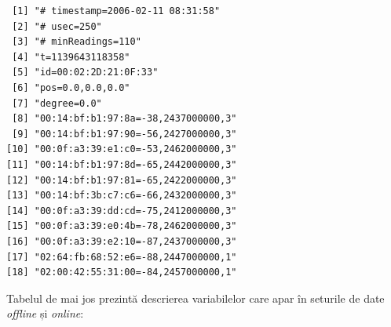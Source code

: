 \documentclass[]{article}
\begin{document}
\begin{verbatim}
 [1] "# timestamp=2006-02-11 08:31:58"   
 [2] "# usec=250"                        
 [3] "# minReadings=110"                 
 [4] "t=1139643118358"                   
 [5] "id=00:02:2D:21:0F:33"              
 [6] "pos=0.0,0.0,0.0"                   
 [7] "degree=0.0"                        
 [8] "00:14:bf:b1:97:8a=-38,2437000000,3"
 [9] "00:14:bf:b1:97:90=-56,2427000000,3"
[10] "00:0f:a3:39:e1:c0=-53,2462000000,3"
[11] "00:14:bf:b1:97:8d=-65,2442000000,3"
[12] "00:14:bf:b1:97:81=-65,2422000000,3"
[13] "00:14:bf:3b:c7:c6=-66,2432000000,3"
[14] "00:0f:a3:39:dd:cd=-75,2412000000,3"
[15] "00:0f:a3:39:e0:4b=-78,2462000000,3"
[16] "00:0f:a3:39:e2:10=-87,2437000000,3"
[17] "02:64:fb:68:52:e6=-88,2447000000,1"
[18] "02:00:42:55:31:00=-84,2457000000,1"
\end{verbatim}

Tabelul de mai jos prezintă descrierea variabilelor care apar în
seturile de date \emph{offline} și \emph{online}:
\end{document}
